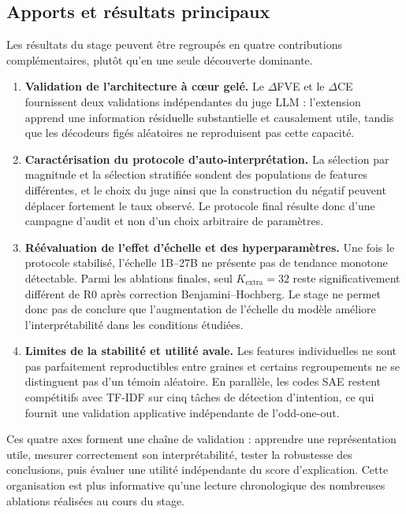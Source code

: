 \documentclass[11pt]{article}
\begin{document}
\subsection{Apports et résultats principaux}

Les résultats du stage peuvent être regroupés en quatre contributions complémentaires,
plutôt qu'en une seule découverte dominante.

\begin{enumerate}
  \item \textbf{Validation de l'architecture à cœur gelé.} Le $\Delta$FVE et le
  $\Delta$CE fournissent deux validations indépendantes du juge LLM : l'extension
  apprend une information résiduelle substantielle et causalement utile, tandis que
  les décodeurs figés aléatoires ne reproduisent pas cette capacité.

  \item \textbf{Caractérisation du protocole d'auto-interprétation.} La sélection par
  magnitude et la sélection stratifiée sondent des populations de features différentes,
  et le choix du juge ainsi que la construction du négatif peuvent déplacer fortement
  le taux observé. Le protocole final résulte donc d'une campagne d'audit et non d'un
  choix arbitraire de paramètres.

  \item \textbf{Réévaluation de l'effet d'échelle et des hyperparamètres.} Une fois le
  protocole stabilisé, l'échelle 1B--27B ne présente pas de tendance monotone détectable.
  Parmi les ablations finales, seul $K_\text{extra}=32$ reste significativement différent
  de R0 après correction Benjamini--Hochberg. Le stage ne permet donc pas de conclure
  que l'augmentation de l'échelle du modèle améliore l'interprétabilité dans les
  conditions étudiées.

  \item \textbf{Limites de la stabilité et utilité avale.} Les features individuelles
  ne sont pas parfaitement reproductibles entre graines et certains regroupements ne
  se distinguent pas d'un témoin aléatoire. En parallèle, les codes SAE restent
  compétitifs avec TF-IDF sur cinq tâches de détection d'intention, ce qui fournit une
  validation applicative indépendante de l'odd-one-out.
\end{enumerate}

Ces quatre axes forment une chaîne de validation : apprendre une représentation utile,
mesurer correctement son interprétabilité, tester la robustesse des conclusions, puis
évaluer une utilité indépendante du score d'explication. Cette organisation est plus
informative qu'une lecture chronologique des nombreuses ablations réalisées au cours
du stage.
\end{document}
